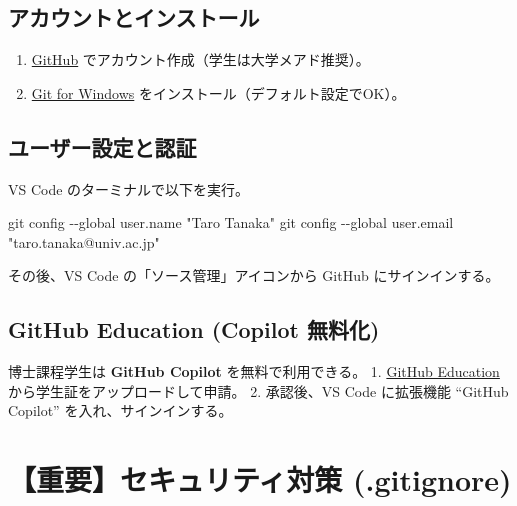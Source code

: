 \documentclass[
  pandoc]{bxjsarticle}
\newenvironment{Shaded}{\begin{snugshade}}{\end{snugshade}}
\newcommand{\AttributeTok}[1]{\textcolor[rgb]{0.40,0.45,0.13}{#1}}
\newcommand{\FunctionTok}[1]{\textcolor[rgb]{0.28,0.35,0.67}{#1}}
\newcommand{\NormalTok}[1]{\textcolor[rgb]{0.00,0.23,0.31}{#1}}
\newcommand{\StringTok}[1]{\textcolor[rgb]{0.13,0.47,0.30}{#1}}
\providecommand{\tightlist}{%
  \setlength{\itemsep}{0pt}\setlength{\parskip}{0pt}}
\begin{document}
\subsection{アカウントとインストール}\label{ux30a2ux30abux30a6ux30f3ux30c8ux3068ux30a4ux30f3ux30b9ux30c8ux30fcux30eb}

\begin{enumerate}
\def\labelenumi{\arabic{enumi}.}
\tightlist
\item
  \href{https://github.com/}{GitHub}
  でアカウント作成（学生は大学メアド推奨）。
\item
  \href{https://gitforwindows.org/}{Git for Windows}
  をインストール（デフォルト設定でOK）。
\end{enumerate}

\subsection{ユーザー設定と認証}\label{ux30e6ux30fcux30b6ux30fcux8a2dux5b9aux3068ux8a8dux8a3c}

VS Code のターミナルで以下を実行。

\begin{Shaded}
\begin{Highlighting}[]
\FunctionTok{git}\NormalTok{ config }\AttributeTok{{-}{-}global}\NormalTok{ user.name }\StringTok{"Taro Tanaka"}
\FunctionTok{git}\NormalTok{ config }\AttributeTok{{-}{-}global}\NormalTok{ user.email }\StringTok{"taro.tanaka@univ.ac.jp"}
\end{Highlighting}
\end{Shaded}

その後、VS Code の「ソース管理」アイコンから GitHub にサインインする。

\subsection{GitHub Education (Copilot
無料化)}\label{github-education-copilot-ux7121ux6599ux5316}

博士課程学生は \textbf{GitHub Copilot} を無料で利用できる。 1.
\href{https://education.github.com/pack}{GitHub Education}
から学生証をアップロードして申請。 2. 承認後、VS Code に拡張機能
``GitHub Copilot'' を入れ、サインインする。

\section{【重要】セキュリティ対策
(.gitignore)}\label{ux91cdux8981ux30bbux30adux30e5ux30eaux30c6ux30a3ux5bfeux7b56-.gitignore}
\end{document}
